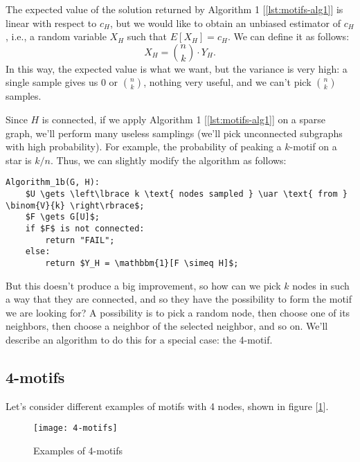 \begin{obs}
    The expected value of the solution returned by Algorithm 1 [\ref{lst:motifs-alg1}] is linear with respect to $c_H$, but we would like to obtain an unbiased estimator of $c_H$, i.e., a random variable $X_H$ such that $E[X_H] = c_H$. We can define it as follows:
    \begin{equation}\label{eq:exh-1}
        X_H = \binom{n}{k} \cdot Y_H.
    \end{equation}
    In this way, the expected value is what we want, but the variance is very high: a single sample gives us 0 or $\binom{n}{k}$, nothing very useful, and we can't pick $\binom{n}{k}$ samples.
\end{obs}

\begin{obs}
    Since $H$ is connected, if we apply Algorithm 1 [\ref{lst:motifs-alg1}] on a sparse graph, we'll perform many useless samplings (we'll pick unconnected subgraphs with high probability). For example, the probability of peaking a $k$-motif on a star is $k/n$. Thus, we can slightly modify the algorithm as follows:
    \begin{lstlisting}[caption={Algorithm 1b}, label={lst:motifs-alg1b}]
Algorithm_1b(G, H):
    $U \gets \left\lbrace k \text{ nodes sampled } \uar \text{ from } \binom{V}{k} \right\rbrace$;
    $F \gets G[U]$;
    if $F$ is not connected:
        return "FAIL";
    else:
        return $Y_H = \mathbbm{1}[F \simeq H]$;
    \end{lstlisting}
    But this doesn't produce a big improvement, so how can we pick $k$ nodes in such a way that they are connected, and so they have the possibility to form the motif we are looking for? A possibility is to pick a random node, then choose one of its neighbors, then choose a neighbor of the selected neighbor, and so on. We'll describe an algorithm to do this for a special case: the 4-motif.
\end{obs}


\subsection{4-motifs}\label{sec:4-motifs}

Let's consider different examples of motifs with 4 nodes, shown in figure [\ref{fig:4-motifs}].

\begin{figure}
    \centering
    \texttt{[image: 4-motifs]}
    \caption{Examples of 4-motifs}
    \label{fig:4-motifs}
\end{figure}

